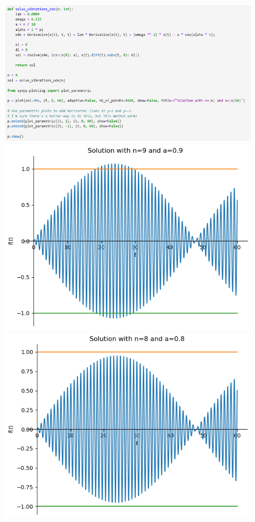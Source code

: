 \documentclass[a4paper]{article}
\begin{document}
\includegraphics[scale=0.45]{Q3-b}
\includegraphics[scale=0.8]{n9}
\includegraphics[scale=0.8]{n8}
\end{document}
